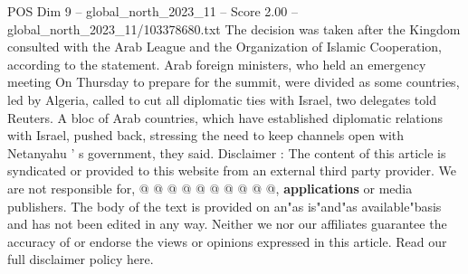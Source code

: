 \begin{textsample}{POS Dim 9 – global\_north\_2023\_11 – Score 2.00 – global\_north\_2023\_11/103378680.txt}
The decision was taken after the Kingdom consulted with the Arab League and the Organization of Islamic Cooperation, according to the statement.
Arab foreign ministers, who held an emergency meeting On Thursday to prepare for the summit, were divided as some countries, led by Algeria, called to cut all diplomatic ties with Israel, two delegates told Reuters.
A bloc of Arab countries, which have established diplomatic relations with Israel, pushed back, stressing the need to keep channels open with Netanyahu ' s government, they said.
Disclaimer : The content of this article is syndicated or provided to this website from an external third party provider.
We are not responsible for, @ @ @ @ @ @ @ @ @ @, \textbf{applications} or media publishers.
The body of the text is provided on an"as is"and"as available"basis and has not been edited in any way.
Neither we nor our affiliates guarantee the accuracy of or endorse the views or opinions expressed in this article.
Read our full disclaimer policy here.

\end{textsample}
